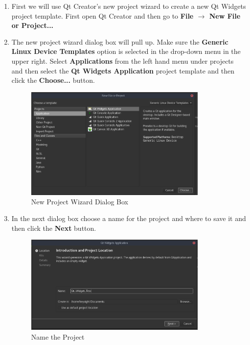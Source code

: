 \documentclass{article}
\begin{document}
	\begin{enumerate}[1.)]
		\item First we will use Qt Creator's new project wizard to create a new Qt Widgets project template. First open Qt Creator and then go to \textbf{File $\rightarrow$ New File or Project...}
		
		\item The new project wizard dialog box will pull up. Make sure the \textbf{Generic Linux Device Templates} option is selected in the drop-down menu in the upper right. Select \textbf{Applications} from the left hand menu under projects and then select the \textbf{Qt Widgets Application} project template and then click the \textbf{Choose...} button.
		
			\begin{figure}[H]
				\centering
				\includegraphics[width=0.85\textwidth]{pics/Choose_Project_Type.png}
				\caption{New Project Wizard Dialog Box}
				\label{Choose_Project_Type}
			\end{figure}
		
		\item In the next dialog box choose a name for the project and where to save it and then click the \textbf{Next} button.
		
			\begin{figure}[H]
				\centering
				\includegraphics[width=0.85\textwidth]{pics/Name_Project.png}
				\caption{Name the Project}
				\label{Name_Project}
			\end{figure}
		

\end{enumerate}
\end{document}
